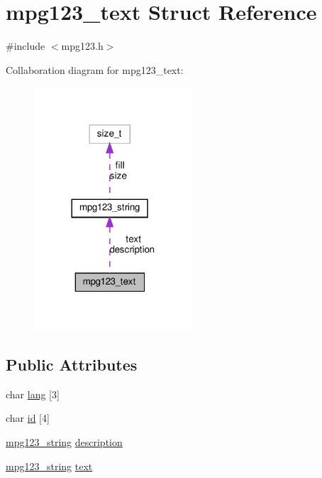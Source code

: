 \hypertarget{structmpg123__text}{}\section{mpg123\+\_\+text Struct Reference}
\label{structmpg123__text}


{\ttfamily \#include $<$mpg123.\+h$>$}



Collaboration diagram for mpg123\+\_\+text\+:
\nopagebreak
\begin{figure}[H]
\begin{center}
\leavevmode
\includegraphics[width=168pt]{structmpg123__text__coll__graph}
\end{center}
\end{figure}
\subsection*{Public Attributes}
\begin{DoxyCompactItemize}
\item 
char \hyperlink{structmpg123__text_aa8c57dde0eeb08c24727391bfc8e69d3}{lang} \mbox{[}3\mbox{]}
\item 
char \hyperlink{structmpg123__text_a6692f67747f8d8e782d3beffce51ee36}{id} \mbox{[}4\mbox{]}
\item 
\hyperlink{structmpg123__string}{mpg123\+\_\+string} \hyperlink{structmpg123__text_afc19e602b7a696d8a0ed03ae6b86f1bf}{description}
\item 
\hyperlink{structmpg123__string}{mpg123\+\_\+string} \hyperlink{structmpg123__text_a574b9464a996281f629858c0216eae18}{text}
\end{DoxyCompactItemize}



